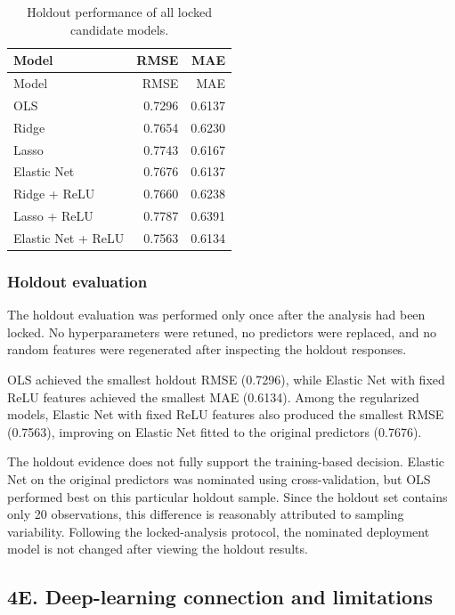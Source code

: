 \documentclass[
  11pt,
]{article}
\begin{document}
\begin{longtable}[]{@{}lrr@{}}
\caption{Holdout performance of all locked candidate
models.}\tabularnewline
\toprule\noalign{}
Model & RMSE & MAE \\
\midrule\noalign{}
\endfirsthead
\toprule\noalign{}
Model & RMSE & MAE \\
\midrule\noalign{}
\endhead
\bottomrule\noalign{}
\endlastfoot
OLS & 0.7296 & 0.6137 \\
Ridge & 0.7654 & 0.6230 \\
Lasso & 0.7743 & 0.6167 \\
Elastic Net & 0.7676 & 0.6137 \\
Ridge + ReLU & 0.7660 & 0.6238 \\
Lasso + ReLU & 0.7787 & 0.6391 \\
Elastic Net + ReLU & 0.7563 & 0.6134 \\
\end{longtable}

\subsubsection{Holdout evaluation}\label{holdout-evaluation}

The holdout evaluation was performed only once after the analysis had
been locked. No hyperparameters were retuned, no predictors were
replaced, and no random features were regenerated after inspecting the
holdout responses.

OLS achieved the smallest holdout RMSE (0.7296), while Elastic Net with
fixed ReLU features achieved the smallest MAE (0.6134). Among the
regularized models, Elastic Net with fixed ReLU features also produced
the smallest RMSE (0.7563), improving on Elastic Net fitted to the
original predictors (0.7676).

The holdout evidence does not fully support the training-based decision.
Elastic Net on the original predictors was nominated using
cross-validation, but OLS performed best on this particular holdout
sample. Since the holdout set contains only 20 observations, this
difference is reasonably attributed to sampling variability. Following
the locked-analysis protocol, the nominated deployment model is not
changed after viewing the holdout results.

\subsection{4E. Deep-learning connection and
limitations}\label{e.-deep-learning-connection-and-limitations}
\end{document}
